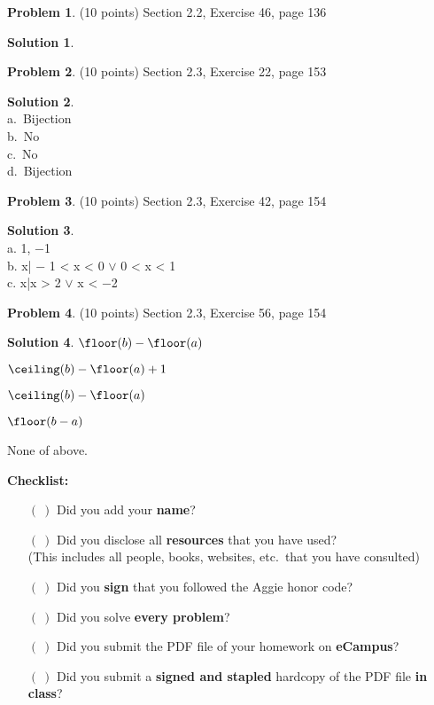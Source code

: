 \documentclass{article}
\theoremstyle{definition}
\newtheorem{problem}{Problem}
\newtheorem*{solution}{Solution}
\newcommand{\checklist}{\noindent\textbf{Checklist:}
\begin{enumerate}
\item[$(~)$] Did you add your \textbf{name}?
\item[$(~)$] Did you disclose all \textbf{resources} that you have used? \\
(This includes all people, books, websites, etc.\ that you have consulted)
\item[$(~)$] Did you \textbf{sign} that you followed the Aggie honor code? 
\item[$(~)$] Did you solve \textbf{every problem}? 
\item[$(~)$] Did you submit the PDF file of your homework on \textbf{eCampus}?
\item[$(~)$] Did you submit a \textbf{signed and stapled} hardcopy of the PDF file \textbf{in class}? 
\end{enumerate}
}
\begin{document}
\begin{problem} (10 points)
Section 2.2, Exercise 46, page 136
\end{problem}
\begin{solution}~\\

\end{solution}

\begin{problem} (10 points)
Section 2.3, Exercise 22, page 153
\end{problem}
\begin{solution}~\\
a.\ Bijection \\
b.\ No \\
c.\ No \\
d.\ Bijection \\
\end{solution}

\begin{problem} (10 points)
Section 2.3, Exercise 42, page 154
\end{problem}
\begin{solution}~\\
a. {1, −1} \\
b. {x| − 1 < x < 0 $\lor$ 0 < x < 1} \\
c. {x|x > 2 $\lor$ x < −2} \\
\end{solution}

\begin{problem} (10 points)
Section 2.3, Exercise 56, page 154
\end{problem}
\begin{solution}
\item  $\floor(b)-\floor(a)$
\item  $\ceiling(b)-\floor(a)+1$
\item  $\ceiling(b)-\floor(a)$
\item  $\floor(b-a)$
\item  None of above. 
\end{solution}

\goodbreak
\checklist
\end{document}
